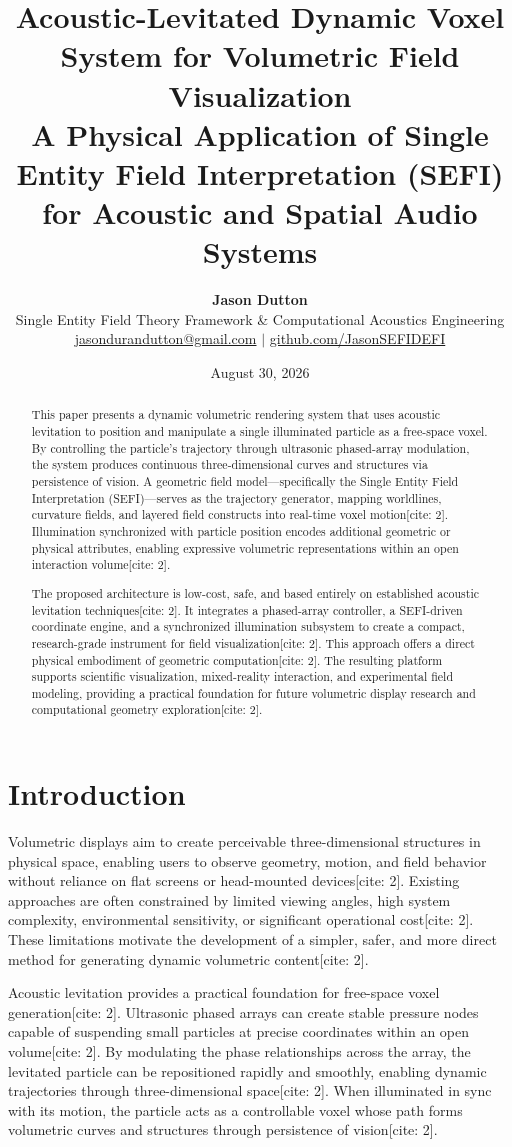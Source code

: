 \documentclass[10pt,twocolumn]{article}
\title{\textbf{Acoustic-Levitated Dynamic Voxel System for Volumetric Field Visualization}\\
\large A Physical Application of Single Entity Field Interpretation (SEFI) for Acoustic and Spatial Audio Systems}
\author{\textbf{Jason Dutton}\\
\small Single Entity Field Theory Framework \& Computational Acoustics Engineering\\
\small \href{mailto:jasondurandutton@gmail.com}{jasondurandutton@gmail.com} $|$ \href{https://github.com/JasonSEFIDEFI}{github.com/JasonSEFIDEFI}}
\date{August 30, 2026}
\begin{document}
\maketitle

\begin{abstract}
This paper presents a dynamic volumetric rendering system that uses acoustic levitation to position and manipulate a single illuminated particle as a free-space voxel. By controlling the particle's trajectory through ultrasonic phased-array modulation, the system produces continuous three-dimensional curves and structures via persistence of vision. A geometric field model—specifically the Single Entity Field Interpretation (SEFI)—serves as the trajectory generator, mapping worldlines, curvature fields, and layered field constructs into real-time voxel motion[cite: 2]. Illumination synchronized with particle position encodes additional geometric or physical attributes, enabling expressive volumetric representations within an open interaction volume[cite: 2].

The proposed architecture is low-cost, safe, and based entirely on established acoustic levitation techniques[cite: 2]. It integrates a phased-array controller, a SEFI-driven coordinate engine, and a synchronized illumination subsystem to create a compact, research-grade instrument for field visualization[cite: 2]. This approach offers a direct physical embodiment of geometric computation[cite: 2]. The resulting platform supports scientific visualization, mixed-reality interaction, and experimental field modeling, providing a practical foundation for future volumetric display research and computational geometry exploration[cite: 2].
\end{abstract}

\section{Introduction}
Volumetric displays aim to create perceivable three-dimensional structures in physical space, enabling users to observe geometry, motion, and field behavior without reliance on flat screens or head-mounted devices[cite: 2]. Existing approaches are often constrained by limited viewing angles, high system complexity, environmental sensitivity, or significant operational cost[cite: 2]. These limitations motivate the development of a simpler, safer, and more direct method for generating dynamic volumetric content[cite: 2].

Acoustic levitation provides a practical foundation for free-space voxel generation[cite: 2]. Ultrasonic phased arrays can create stable pressure nodes capable of suspending small particles at precise coordinates within an open volume[cite: 2]. By modulating the phase relationships across the array, the levitated particle can be repositioned rapidly and smoothly, enabling dynamic trajectories through three-dimensional space[cite: 2]. When illuminated in sync with its motion, the particle acts as a controllable voxel whose path forms volumetric curves and structures through persistence of vision[cite: 2].
\end{document}
